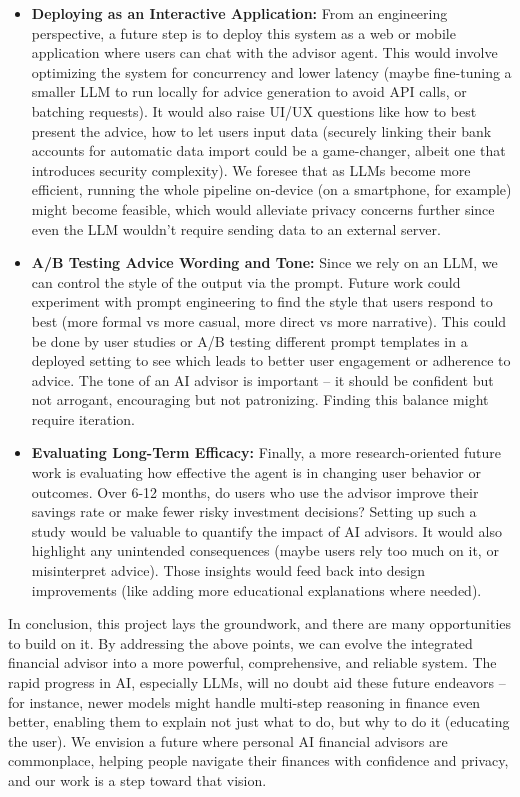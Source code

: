 \documentclass{scrartcl}
\begin{document}
\begin{itemize}
    \item \textbf{Deploying as an Interactive Application:} From an engineering perspective, a future step is to deploy this system as a web or mobile application where users can chat with the advisor agent. This would involve optimizing the system for concurrency and lower latency (maybe fine-tuning a smaller LLM to run locally for advice generation to avoid API calls, or batching requests). It would also raise UI/UX questions like how to best present the advice, how to let users input data (securely linking their bank accounts for automatic data import could be a game-changer, albeit one that introduces security complexity). We foresee that as LLMs become more efficient, running the whole pipeline on-device (on a smartphone, for example) might become feasible, which would alleviate privacy concerns further since even the LLM wouldn’t require sending data to an external server.
    \item \textbf{A/B Testing Advice Wording and Tone:} Since we rely on an LLM, we can control the style of the output via the prompt. Future work could experiment with prompt engineering to find the style that users respond to best (more formal vs more casual, more direct vs more narrative). This could be done by user studies or A/B testing different prompt templates in a deployed setting to see which leads to better user engagement or adherence to advice. The tone of an AI advisor is important – it should be confident but not arrogant, encouraging but not patronizing. Finding this balance might require iteration.
    \item \textbf{Evaluating Long-Term Efficacy:} Finally, a more research-oriented future work is evaluating how effective the agent is in changing user behavior or outcomes. Over 6-12 months, do users who use the advisor improve their savings rate or make fewer risky investment decisions? Setting up such a study would be valuable to quantify the impact of AI advisors. It would also highlight any unintended consequences (maybe users rely too much on it, or misinterpret advice). Those insights would feed back into design improvements (like adding more educational explanations where needed).
\end{itemize}

In conclusion, this project lays the groundwork, and there are many opportunities to build on it. By addressing the above points, we can evolve the integrated financial advisor into a more powerful, comprehensive, and reliable system. The rapid progress in AI, especially LLMs, will no doubt aid these future endeavors – for instance, newer models might handle multi-step reasoning in finance even better, enabling them to explain not just what to do, but why to do it (educating the user). We envision a future where personal AI financial advisors are commonplace, helping people navigate their finances with confidence and privacy, and our work is a step toward that vision.
\end{document}
